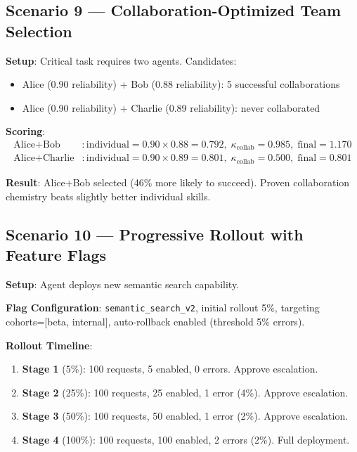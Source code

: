 \documentclass[11pt]{article}
\begin{document}
\subsection{Scenario 9 --- Collaboration-Optimized Team Selection}

\noindent\textbf{Setup}: Critical task requires two agents. Candidates:
\begin{itemize}[noitemsep,topsep=2pt]
  \item Alice (0.90 reliability) + Bob (0.88 reliability): 5 successful collaborations
  \item Alice (0.90 reliability) + Charlie (0.89 reliability): never collaborated
\end{itemize}

\noindent\textbf{Scoring}:
\begin{align*}
  \text{Alice+Bob} &: \text{individual}=0.90 \times 0.88 = 0.792, \; \kappa_{\text{collab}}=0.985, \; \text{final}=1.170 \\
  \text{Alice+Charlie} &: \text{individual}=0.90 \times 0.89 = 0.801, \; \kappa_{\text{collab}}=0.500, \; \text{final}=0.801
\end{align*}

\noindent\textbf{Result}: Alice+Bob selected (46\% more likely to succeed).
Proven collaboration chemistry beats slightly better individual skills.

\subsection{Scenario 10 --- Progressive Rollout with Feature Flags}

\noindent\textbf{Setup}: Agent deploys new semantic search capability.

\noindent\textbf{Flag Configuration}: \texttt{semantic\_search\_v2}, initial
rollout 5\%, targeting cohorts=[beta, internal], auto-rollback enabled (threshold
5\% errors).

\noindent\textbf{Rollout Timeline}:
\begin{enumerate}[noitemsep,topsep=2pt]
  \item \textbf{Stage 1} (5\%): 100 requests, 5 enabled, 0 errors. Approve escalation.
  \item \textbf{Stage 2} (25\%): 100 requests, 25 enabled, 1 error (4\%). Approve escalation.
  \item \textbf{Stage 3} (50\%): 100 requests, 50 enabled, 1 error (2\%). Approve escalation.
  \item \textbf{Stage 4} (100\%): 100 requests, 100 enabled, 2 errors (2\%). Full deployment.
\end{enumerate}
\end{document}
